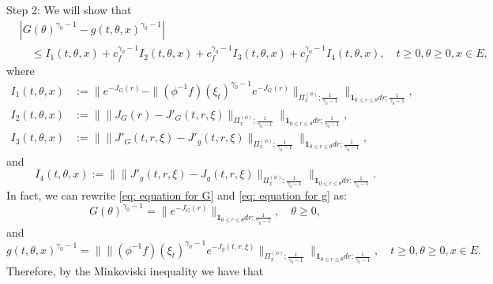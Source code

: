 \documentclass[12pt, a4paper]{amsart}
\theoremstyle{definition}
\numberwithin{equation}{section}
\begin{document}
	Step 2: We will show that 
\[\begin{split}
	&|  G(\theta)^{\gamma_0 - 1} - g(t,\theta,x)^{\gamma_0 - 1} | 
	\\&\quad \leq I_1(t,\theta,x) +c^{\gamma_0 - 1}_f I_2(t,\theta,x) +c^{\gamma_0 - 1}_f I_3(t,\theta,x) + c^{\gamma_0 - 1}_f I_4(t,\theta,x),
	\quad t\geq 0, \theta \geq 0, x\in E,
\end{split}\]
	where
\[\begin{split}
	I_1(t,\theta,x)
	&:= \big\| e^{ - J_G(r)} - \| (\phi^{-1}f)(\xi_t)^{\gamma_0 - 1} e^{-J_G(r)} \|_{\Pi_x^{(\phi)};\frac{1}{\gamma_0 - 1}} \big\|_{\mathbf 1_{0\leq r\leq \theta} dr;\frac{1}{\gamma_0 - 1}} ,
	\\I_2(t,\theta,x)
	&:= \big\|  \|  J_G(r) - J'_G(t,r,\xi)  \|_{\Pi_x^{(\phi)};\frac{1}{\gamma_0 - 1}} \big\|_{\mathbf 1_{0\leq r\leq \theta} dr;\frac{1}{\gamma_0 - 1}},
	\\I_3(t,\theta,x)
	&:= \big\| \|  J'_G(t,r,\xi) - J'_g(t,r,\xi)  \|_{\Pi_x^{(\phi)};\frac{1}{\gamma_0 - 1}} \big\|_{\mathbf 1_{0\leq r\leq \theta} dr;\frac{1}{\gamma_0 - 1}},
\end{split}\]
	and
\[
	I_4(t,\theta,x)
	:= \big\| \| J'_g(t,r,\xi) - J_g(t,r,\xi)  \|_{\Pi_x^{(\phi)};\frac{1}{\gamma_0 - 1}} \big\|_{\mathbf 1_{0\leq r\leq \theta} dr;\frac{1}{\gamma_0 - 1}}.
\]
	In fact, we can rewrite \eqref{eq: equation for G} and \eqref{eq: equation for g} as:
\[
	G(\theta)^{\gamma_0 - 1} = 
	\| e^{ - J_G(r)} \|_{\mathbf 1_{0\leq r\leq \theta} dr;\frac{1}{\gamma_0 - 1}},
	\quad \theta \geq 0,
\]	
	and
\[
	g(t,\theta,x)^{\gamma_0 - 1} 
	=\big\| \| (\phi^{-1}f)(\xi_t) ^{\gamma_0 - 1} e^{-J_g(t,r,\xi)} \|_{\Pi_x^{(\phi)};\frac{1}{\gamma_0 - 1}} \big\|_{\mathbf 1_{0\leq r\leq \theta} dr;\frac{1}{\gamma_0 - 1}}, 
	\quad t\geq 0, \theta \geq 0, x\in E.
\]
	Therefore, by the Minkoviski inequality we have that
\end{document}
